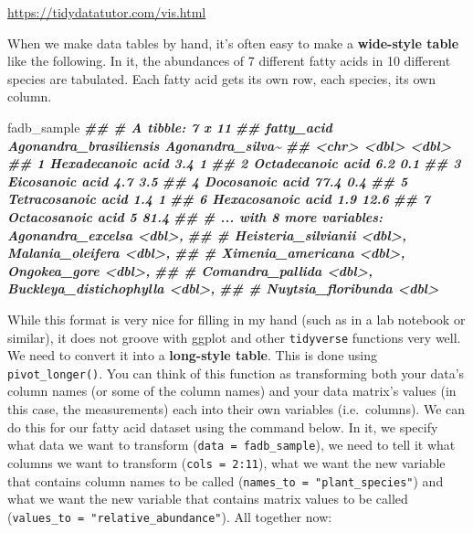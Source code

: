 \documentclass[
]{krantz}
\newenvironment{Shaded}{\begin{snugshade}}{\end{snugshade}}
\newcommand{\DocumentationTok}[1]{\textcolor[rgb]{0.56,0.35,0.01}{\textbf{\textit{#1}}}}
\newcommand{\NormalTok}[1]{#1}
\begin{document}
\url{https://tidydatatutor.com/vis.html}

When we make data tables by hand, it's often easy to make a \textbf{wide-style table} like the following. In it, the abundances of 7 different fatty acids in 10 different species are tabulated. Each fatty acid gets its own row, each species, its own column.

\begin{Shaded}
\begin{Highlighting}[]
\NormalTok{fadb\_sample}
\DocumentationTok{\#\# \# A tibble: 7 x 11}
\DocumentationTok{\#\#   fatty\_acid         Agonandra\_brasiliensis Agonandra\_silva\textasciitilde{}}
\DocumentationTok{\#\#   \textless{}chr\textgreater{}                               \textless{}dbl\textgreater{}            \textless{}dbl\textgreater{}}
\DocumentationTok{\#\# 1 Hexadecanoic acid                     3.4              1  }
\DocumentationTok{\#\# 2 Octadecanoic acid                     6.2              0.1}
\DocumentationTok{\#\# 3 Eicosanoic acid                       4.7              3.5}
\DocumentationTok{\#\# 4 Docosanoic acid                      77.4              0.4}
\DocumentationTok{\#\# 5 Tetracosanoic acid                    1.4              1  }
\DocumentationTok{\#\# 6 Hexacosanoic acid                     1.9             12.6}
\DocumentationTok{\#\# 7 Octacosanoic acid                     5               81.4}
\DocumentationTok{\#\# \# ... with 8 more variables: Agonandra\_excelsa \textless{}dbl\textgreater{},}
\DocumentationTok{\#\# \#   Heisteria\_silvianii \textless{}dbl\textgreater{}, Malania\_oleifera \textless{}dbl\textgreater{},}
\DocumentationTok{\#\# \#   Ximenia\_americana \textless{}dbl\textgreater{}, Ongokea\_gore \textless{}dbl\textgreater{},}
\DocumentationTok{\#\# \#   Comandra\_pallida \textless{}dbl\textgreater{}, Buckleya\_distichophylla \textless{}dbl\textgreater{},}
\DocumentationTok{\#\# \#   Nuytsia\_floribunda \textless{}dbl\textgreater{}}
\end{Highlighting}
\end{Shaded}

While this format is very nice for filling in my hand (such as in a lab notebook or similar), it does not groove with ggplot and other \texttt{tidyverse} functions very well. We need to convert it into a \textbf{long-style table}. This is done using \texttt{pivot\_longer()}. You can think of this function as transforming both your data's column names (or some of the column names) and your data matrix's values (in this case, the measurements) each into their own variables (i.e.~columns). We can do this for our fatty acid dataset using the command below. In it, we specify what data we want to transform (\texttt{data\ =\ fadb\_sample}), we need to tell it what columns we want to transform (\texttt{cols\ =\ 2:11}), what we want the new variable that contains column names to be called (\texttt{names\_to\ =\ "plant\_species"}) and what we want the new variable that contains matrix values to be called (\texttt{values\_to\ =\ "relative\_abundance"}). All together now:
\end{document}
